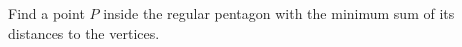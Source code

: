 Find a point $P$ inside the regular pentagon with the minimum sum of its distances to the vertices.
